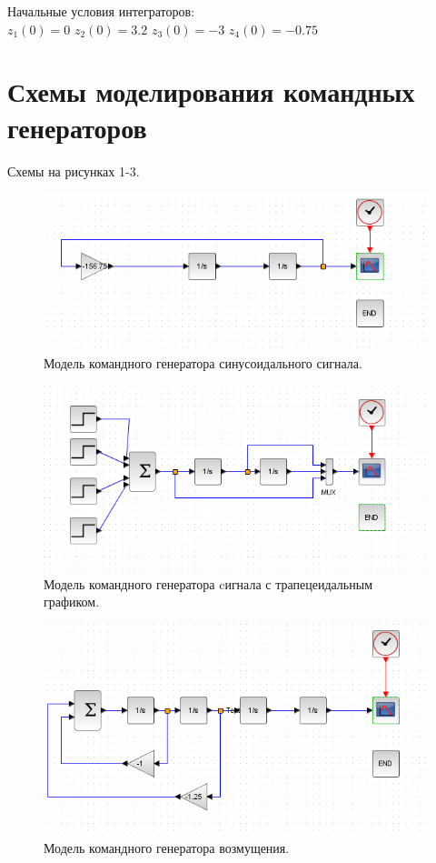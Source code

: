 \documentclass[12pt, a4paper] {ncc}
\begin{document}
		Начальные условия интеграторов:\\
		$z_1(0) = 0$
		$z_2(0) = 3.2$
		$z_3(0) = -3$
		$z_4(0) = -0.75$

\section{Схемы моделирования командных генераторов}
	Схемы на рисунках 1-3.

	\begin{figure}[ht!]
		\includegraphics[scale=0.5]{./model_sin.png}
		\caption{Модель командного генератора синусоидального сигнала.}
	\end{figure}

	\begin{figure}[ht!]
		\includegraphics[scale=0.5]{./model_trap.png}
		\caption{Модель командного генератора cигнала с трапецеидальным графиком.}
	\end{figure}

	\begin{figure}[ht!]
		\includegraphics[scale=0.5]{./model_v.png}
		\caption{Модель командного генератора возмущения.}
	\end{figure}
\end{document}
